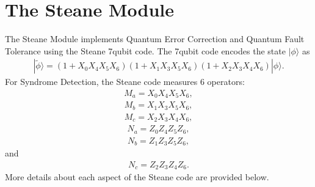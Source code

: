 \documentclass[letterpaper,10pt,english]{sphinxmanual}
\begin{document}
\section{The Steane Module}
\label{\detokenize{Steane:the-steane-module}}\label{\detokenize{Steane::doc}}\label{\detokenize{Steane:module-Steane}}
\sphinxAtStartPar
The Steane Module implements Quantum Error Correction and Quantum Fault Tolerance using the Steane 7\sphinxhyphen{}qubit code. 
The 7\sphinxhyphen{}qubit code encodes the state \(|\phi\rangle\) as 
\begin{equation*}
\begin{split}|\tilde{\phi}\rangle = (1+X_0X_4X_5X_6)(1+X_1X_3X_5X_6)(1+X_2X_3X_4X_6)|\phi\rangle.\end{split}
\end{equation*}
For Syndrome Detection, the Steane code measures 6 operators:
\begin{equation*}
\begin{split}M_a = X_0X_4X_5X_6,\end{split}
\end{equation*}
\begin{equation*}
\begin{split}M_b = X_1X_3X_5X_6,\end{split}
\end{equation*}
\begin{equation*}
\begin{split}M_c = X_2X_3X_4X_6,\end{split}
\end{equation*}
\begin{equation*}
\begin{split}N_a = Z_0Z_4Z_5Z_6,\end{split}
\end{equation*}
\begin{equation*}
\begin{split}N_b = Z_1Z_3Z_5Z_6,\end{split}
\end{equation*}
and
\begin{equation*}
\begin{split}N_c = Z_2Z_3Z_4Z_6.\end{split}
\end{equation*}
More details about each aspect of the Steane code are provided below.
\end{document}
